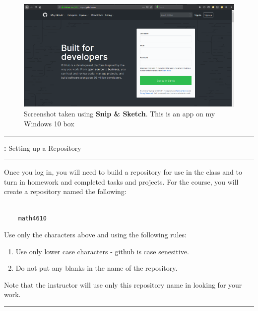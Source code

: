 \documentclass[10pt,fleqn]{article}
\begin{document}
\vfill
\begin{figure}[h]
\centering
\includegraphics{../images/github_01.png}
\vskip0.1in
\caption{{Screenshot} taken using {\bf Snip \& Sketch}. This is an app on
         my Windows 10 box}
\end{figure}
\eject
\vskip0.1in\hrule\vskip0.1in
\noindent
{{\bf :} Setting up a Repository} 
\vskip0.1in\hrule\vskip0.1in
\noindent
Once you log in, you will need to build a repository for use in the class and
to turn in homework and completed tasks and projects. For the course, you will
create a repository named the following:
\begin{verbatim}

    math4610

\end{verbatim}
Use only the characters above and using the following rules:
\begin{enumerate}
  \item Use only lower case characters - github is case senesitive.
  \item Do not put any blanks in the name of the repository.
\end{enumerate}
Note that the instructor will use only this repository name in looking for your
work.
\vskip0.1in\hrule\vskip0.1in
\vfill
\end{document}
